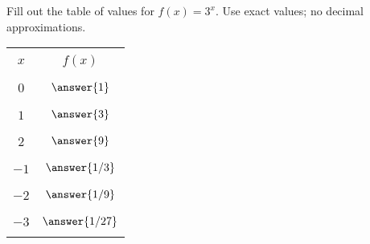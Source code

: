 \documentclass{ximera}
\begin{document}
\begin{problem}\label{prob:160hom7prob3}
Fill out the table of values for $f(x)=3^x$.  Use exact values; no decimal approximations.
\begin{center}
\begin{tabular}{|c|c|}
 \hline
 &   \\
 $x$& $f(x)$ \\
 &  \\
  \hline
  &  \\
 $0$ & $\answer{1}$ \\
  & \\
 \hline
  & \\
 $1$ & $\answer{3}$ \\
  & \\
 \hline
  & \\
  $2$ & $\answer{9}$  \\
  & \\
 \hline
 & \\
  $-1$ & $\answer{1/3}$  \\
  & \\
 \hline
 & \\
  $-2$ & $\answer{1/9}$  \\
  & \\
 \hline
 & \\
  $-3$ & $\answer{1/27}$  \\
  & \\
 \hline
 \end{tabular}
\end{center}    
\end{problem}


  
 
\end{document}
